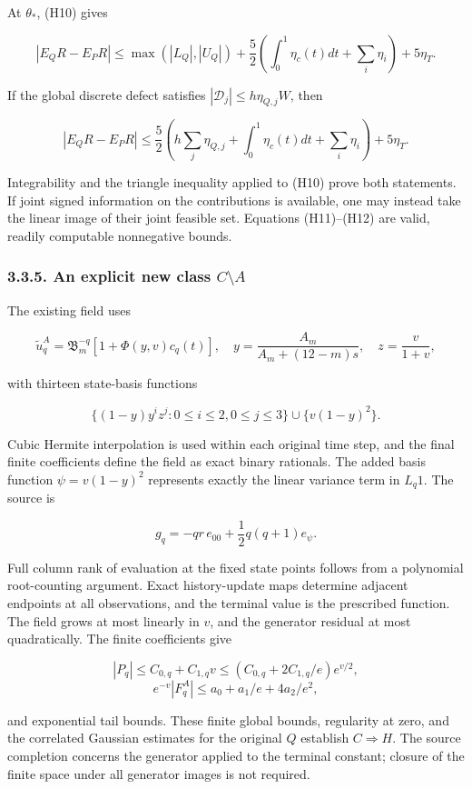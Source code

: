 \documentclass[a4paper,11pt]{article}
\begin{document}
At $\theta_*$, (H10) gives

\[
|E_QR-E_PR|\le
\max(|L_Q|,|U_Q|)
+\frac52\left(\int_0^1\eta_c(t)dt+\sum_i\eta_i\right)
+5\eta_T.
\tag{H11}
\]

If the global discrete defect satisfies \( |\mathscr D_j|\le h\eta_{Q,j}W\), then

\[
|E_QR-E_PR|\le
\frac52\left(h\sum_j\eta_{Q,j}
+\int_0^1\eta_c(t)dt+\sum_i\eta_i\right)+5\eta_T.
\tag{H12}
\]

Integrability and the triangle inequality applied to (H10) prove both statements. If joint signed information on the contributions is available, one may instead take the linear image of their joint feasible set. Equations (H11)–(H12) are valid, readily computable nonnegative bounds.

\subsubsection*{3.3.5. An explicit new class $C\setminus A$}

The existing field uses

\[
\widetilde u_q^A=\mathfrak B_m^{-q}
\left[1+\Phi(y,v)c_q(t)\right],\quad
y=\frac{A_m}{A_m+(12-m)s},\quad z=\frac{v}{1+v},
\]

with thirteen state-basis functions

\[
\{(1-y)y^iz^j:0\le i\le2,0\le j\le3\}
\cup\{v(1-y)^2\}.
\]

Cubic Hermite interpolation is used within each original time step, and the final finite coefficients define the field as exact binary rationals. The added basis function \(\psi=v(1-y)^2\) represents exactly the linear variance term in \(L_q1\). The source is

\[
g_q=-qr\,e_{00}+\frac12q(q+1)e_\psi.
\]

Full column rank of evaluation at the fixed state points follows from a polynomial root-counting argument. Exact history-update maps determine adjacent endpoints at all observations, and the terminal value is the prescribed function. The field grows at most linearly in $v$, and the generator residual at most quadratically. The finite coefficients give

\[
|P_q|\le C_{0,q}+C_{1,q}v
\le(C_{0,q}+2C_{1,q}/e)e^{v/2},
\]
\[
e^{-v}|F_q^A|\le a_0+a_1/e+4a_2/e^2,
\]

and exponential tail bounds. These finite global bounds, regularity at zero, and the correlated Gaussian estimates for the original $Q$ establish $C\Rightarrow H$. The source completion concerns the generator applied to the terminal constant; closure of the finite space under all generator images is not required.
\end{document}

